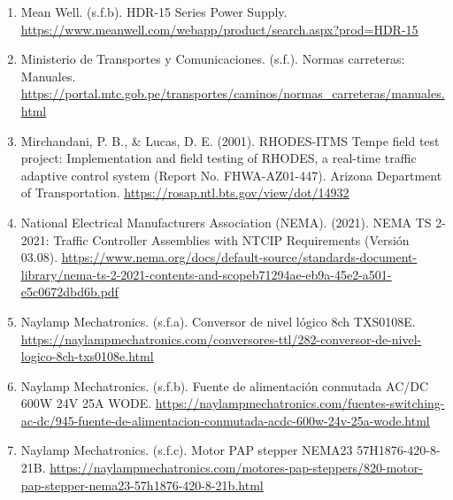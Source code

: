\documentclass[12pt,a4paper,oneside]{report}
\providecommand{\ul}[1]{\underline{#1}}
\begin{document}
\begin{enumerate}
  Mean Well. (s.f.a). HDR-15-12 -- 15W 12V DIN Rail Power Supply. \href{https://meanwell-ps.com/products/hdr-15-12}{\ul{https://meanwell-ps.com/products/hdr-15-12}}
\item
  Mean Well. (s.f.b). HDR-15 Series Power Supply. \href{https://www.meanwell.com/webapp/product/search.aspx?prod=HDR-15}{\ul{https://www.meanwell.com/webapp/product/search.aspx?prod=HDR-15}}
\item
  Ministerio de Transportes y Comunicaciones. (s.f.). Normas carreteras: Manuales. \href{https://portal.mtc.gob.pe/transportes/caminos/normas_carreteras/manuales.html}{\ul{https://portal.mtc.gob.pe/transportes/caminos/normas\_carreteras/manuales.html}}
\item
  Mirchandani, P. B., \& Lucas, D. E. (2001). RHODES-ITMS Tempe field test project: Implementation and field testing of RHODES, a real-time traffic adaptive control system (Report No. FHWA-AZ01-447). Arizona Department of Transportation. \href{https://rosap.ntl.bts.gov/view/dot/14932}{\ul{https://rosap.ntl.bts.gov/view/dot/14932}}
\item
  National Electrical Manufacturers Association (NEMA). (2021). NEMA TS 2-2021: Traffic Controller Assemblies with NTCIP Requirements (Versión 03.08). \href{https://www.nema.org/docs/default-source/standards-document-library/nema-ts-2-2021-contents-and-scopeb71294ae-eb9a-45e2-a501-e5c0672dbd6b.pdf}{\ul{https://www.nema.org/docs/default-source/standards-document-library/nema-ts-2-2021-contents-and-scopeb71294ae-eb9a-45e2-a501-e5c0672dbd6b.pdf}}
\item
  Naylamp Mechatronics. (s.f.a). Conversor de nivel lógico 8ch TXS0108E. \href{https://naylampmechatronics.com/conversores-ttl/282-conversor-de-nivel-logico-8ch-txs0108e.html}{\ul{https://naylampmechatronics.com/conversores-ttl/282-conversor-de-nivel-logico-8ch-txs0108e.html}}
\item
  Naylamp Mechatronics. (s.f.b). Fuente de alimentación conmutada AC/DC 600W 24V 25A WODE. \href{https://naylampmechatronics.com/fuentes-switching-ac-dc/945-fuente-de-alimentacion-conmutada-acdc-600w-24v-25a-wode.html}{\ul{https://naylampmechatronics.com/fuentes-switching-ac-dc/945-fuente-de-alimentacion-conmutada-acdc-600w-24v-25a-wode.html}}
\item
  Naylamp Mechatronics. (s.f.c). Motor PAP stepper NEMA23 57H1876-420-8-21B. \href{https://naylampmechatronics.com/motores-pap-steppers/820-motor-pap-stepper-nema23-57h1876-420-8-21b.html}{\ul{https://naylampmechatronics.com/motores-pap-steppers/820-motor-pap-stepper-nema23-57h1876-420-8-21b.html}}

\end{enumerate}
\end{document}
